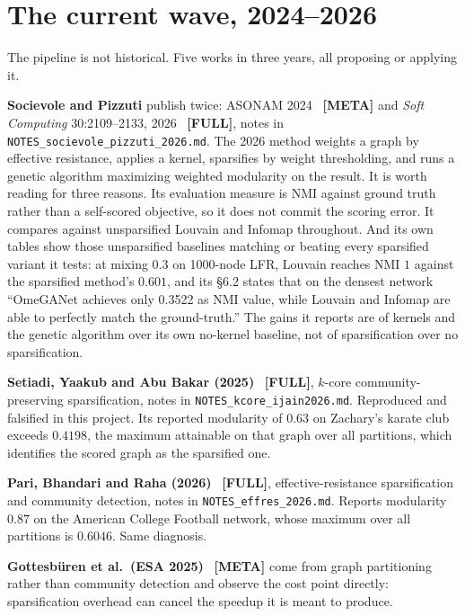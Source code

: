 \documentclass[10pt,a4paper]{article}
\begin{document}
\section{The current wave, 2024--2026}

The pipeline is not historical. Five works in three years, all proposing or applying it.

\textbf{Socievole and Pizzuti} publish twice: ASONAM 2024~\cite{socievole2024community}
\textbf{[META]} and \emph{Soft Computing} 30:2109--2133, 2026~\cite{socievole2026effective}
\textbf{[FULL]}, notes in \texttt{NOTES\_socievole\_pizzuti\_2026.md}. The 2026 method weights a
graph by effective resistance, applies a kernel, sparsifies by weight thresholding, and runs a
genetic algorithm maximizing weighted modularity on the result. It is worth reading for three
reasons. Its evaluation measure is NMI against ground truth rather than a self-scored objective,
so it does not commit the scoring error. It compares against unsparsified Louvain and Infomap
throughout. And its own tables show those unsparsified baselines matching or beating every
sparsified variant it tests: at mixing $0.3$ on 1000-node LFR, Louvain reaches NMI $1$ against
the sparsified method's $0.601$, and its \S6.2 states that on the densest network ``OmeGANet
achieves only 0.3522 as NMI value, while Louvain and Infomap are able to perfectly match the
ground-truth.'' The gains it reports are of kernels and the genetic algorithm over its own
no-kernel baseline, not of sparsification over no sparsification.

\textbf{Setiadi, Yaakub and Abu Bakar (2025)}~\cite{setiadi2025community} \textbf{[FULL]},
$k$-core community-preserving sparsification, notes in \texttt{NOTES\_kcore\_ijain2026.md}.
Reproduced and falsified in this project. Its reported modularity of $0.63$ on Zachary's karate
club exceeds $0.4198$, the maximum attainable on that graph over all partitions, which
identifies the scored graph as the sparsified one.

\textbf{Pari, Bhandari and Raha (2026)}~\cite{pari2026effective} \textbf{[FULL]},
effective-resistance sparsification and community detection, notes in
\texttt{NOTES\_effres\_2026.md}. Reports modularity $0.87$ on the American College Football
network, whose maximum over all partitions is $0.6046$. Same diagnosis.

\textbf{Gottesb\"{u}ren et al.\ (ESA 2025)}~\cite{gottesburen2025linear} \textbf{[META]} come
from graph partitioning rather than community detection and observe the cost point directly:
sparsification overhead can cancel the speedup it is meant to produce.
\end{document}
